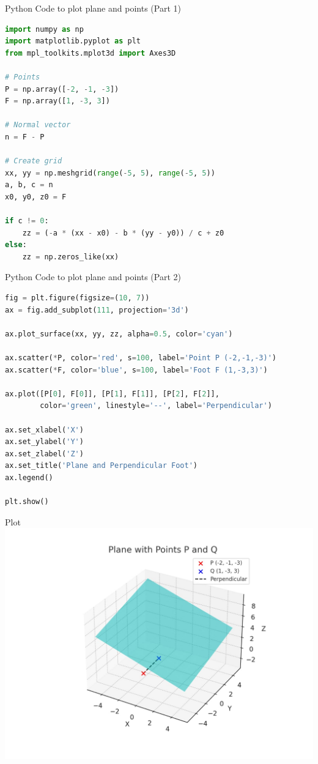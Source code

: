 \documentclass{beamer}
\begin{document}
\begin{frame}[fragile]{Python Code to plot plane and points (Part 1)}
\begin{lstlisting}[language=Python]
import numpy as np
import matplotlib.pyplot as plt
from mpl_toolkits.mplot3d import Axes3D

# Points
P = np.array([-2, -1, -3])
F = np.array([1, -3, 3])

# Normal vector
n = F - P

# Create grid
xx, yy = np.meshgrid(range(-5, 5), range(-5, 5))
a, b, c = n
x0, y0, z0 = F

if c != 0:
    zz = (-a * (xx - x0) - b * (yy - y0)) / c + z0
else:
    zz = np.zeros_like(xx)
\end{lstlisting}
\end{frame}

\begin{frame}[fragile]{Python Code to plot plane and points (Part 2)}
\begin{lstlisting}[language=Python]
fig = plt.figure(figsize=(10, 7))
ax = fig.add_subplot(111, projection='3d')

ax.plot_surface(xx, yy, zz, alpha=0.5, color='cyan')

ax.scatter(*P, color='red', s=100, label='Point P (-2,-1,-3)')
ax.scatter(*F, color='blue', s=100, label='Foot F (1,-3,3)')

ax.plot([P[0], F[0]], [P[1], F[1]], [P[2], F[2]], 
        color='green', linestyle='--', label='Perpendicular')

ax.set_xlabel('X')
ax.set_ylabel('Y')
ax.set_zlabel('Z')
ax.set_title('Plane and Perpendicular Foot')
ax.legend()

plt.show()
\end{lstlisting}
\end{frame}

\begin{frame}{Plot}
    \centering
    \includegraphics[width=\columnwidth, height=0.8\textheight, keepaspectratio]{figs/python_plot.png}     
\end{frame}
\end{document}
